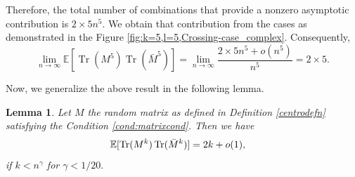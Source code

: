 \documentclass[12pt]{amsart}
\theoremstyle{plain}
\newtheorem{lemma}[Thm]{Lemma}
\theoremstyle{definition}
\newcommand{\Tr}{\operatorname{Tr}}
\begin{document}
Therefore, the total number of combinations that provide a nonzero asymptotic contribution is $2 \times 5n^{5}$. We obtain that contribution from the cases as demonstrated in the Figure \ref{fig:k=5,l=5,Crossing-case_complex}.
Consequently,
$$
\lim_{{n \to \infty}} \mathbb{E}[\Tr(M^{5})\Tr(\bar{M}^{5})]
 =\lim_{{n \to \infty}} \frac{2\times 5 n^5+o(n^{5})}{n^{5}}= 2\times 5.
$$

Now, we generalize the above result in the following lemma.
\begin{lemma}{\label{lemma:equal power_complex}}
Let $M$ the random matrix as defined in Definition \ref{centrodefn} satisfying the Condition \ref{cond:matrixcond}. Then we have 
    \begin{align}
      \mathbb{E}[\Tr(M^{k})\Tr(\bar{M}^{k})]
       &=2k+o(1),\notag
    \end{align}
    if $k<n^{\gamma}$ for $\gamma<1/20.$
    \end{lemma}  
\end{document}
